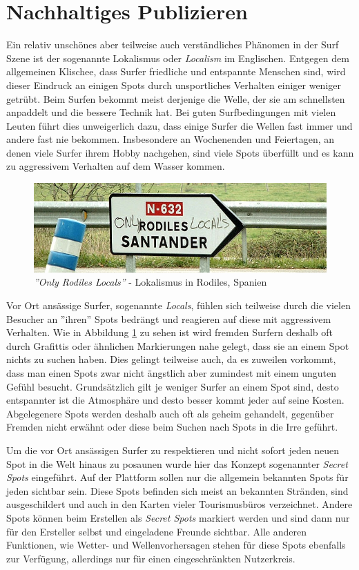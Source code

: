 \section{Nachhaltiges Publizieren}
Ein relativ unschönes aber teilweise auch verständliches Phänomen in
der Surf Szene ist der sogenannte Lokalismus oder \textit{Localism} im
Englischen. Entgegen dem allgemeinen Klischee, dass Surfer friedliche
und entspannte Menschen sind, wird dieser Eindruck an einigen Spots
durch unsportliches Verhalten einiger weniger getrübt. Beim Surfen
bekommt meist derjenige die Welle, der sie am schnellsten anpaddelt
und die bessere Technik hat. Bei guten Surfbedingungen mit vielen
Leuten führt dies unweigerlich dazu, dass einige Surfer die Wellen
fast immer und andere fast nie bekommen. Insbesondere an Wochenenden
und Feiertagen, an denen viele Surfer ihrem Hobby nachgehen, sind
viele Spots überfüllt und es kann zu aggressivem Verhalten auf dem
Wasser kommen. 

\begin{figure}[h]
  \includegraphics[width=\textwidth]{bilder/locals-only}
  \caption{\textit{''Only Rodiles Locals''} - Lokalismus in Rodiles,
    Spanien}
  \label{locals-only}
\end{figure}

Vor Ort ansässige Surfer, sogenannte \textit{Locals}, fühlen sich
teilweise durch die vielen Besucher an ''ihren'' Spots bedrängt und
reagieren auf diese mit aggressivem Verhalten. Wie in Abbildung
\ref{locals-only} zu sehen ist wird fremden Surfern deshalb oft durch
Grafittis oder ähnlichen Markierungen nahe gelegt, dass sie an einem
Spot nichts zu suchen haben. Dies gelingt teilweise auch, da es
zuweilen vorkommt, dass man einen Spots zwar nicht ängstlich aber
zumindest mit einem unguten Gefühl besucht. Grundsätzlich gilt je
weniger Surfer an einem Spot sind, desto entspannter ist die
Atmosphäre und desto besser kommt jeder auf seine Kosten. Abgelegenere
Spots werden deshalb auch oft als geheim gehandelt, gegenüber Fremden
nicht erwähnt oder diese beim Suchen nach Spots in die Irre geführt.

Um die vor Ort ansässigen Surfer zu respektieren und nicht sofort
jeden neuen Spot in die Welt hinaus zu posaunen wurde hier das Konzept
sogenannter \textit{Secret Spots} eingeführt. Auf der Plattform sollen
nur die allgemein bekannten Spots für jeden sichtbar sein. Diese Spots
befinden sich meist an bekannten Stränden, sind ausgeschildert und
auch in den Karten vieler Tourismusbüros verzeichnet. Andere Spots
können beim Erstellen als \textit{Secret Spots} markiert werden und
sind dann nur für den Ersteller selbst und eingeladene Freunde
sichtbar. Alle anderen Funktionen, wie Wetter- und Wellenvorhersagen
stehen für diese Spots ebenfalls zur Verfügung, allerdings nur für
einen eingeschränkten Nutzerkreis.

